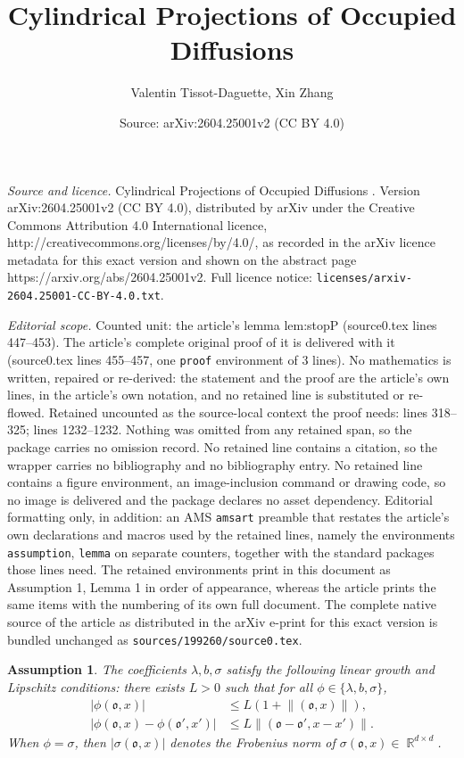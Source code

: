 \documentclass[10pt,a4paper]{amsart}
\title{\vspace{-10mm} Cylindrical Projections of Occupied Diffusions \vspace{-3mm}}
\author{Valentin Tissot-Daguette, Xin Zhang}
\date{Source: arXiv:2604.25001v2 (CC BY 4.0)}
\newtheorem{assumption}{Assumption}
\DeclareMathOperator{\R}{\mathbb{R}}
\def\mo{\mathfrak{o}}
\begin{document}
\maketitle

\noindent\emph{Source and licence.} \vspace{-10mm} Cylindrical Projections of Occupied Diffusions \vspace{-3mm}. Version arXiv:2604.25001v2 (CC BY 4.0), distributed by arXiv under the Creative Commons Attribution 4.0 International licence, http://creativecommons.org/licenses/by/4.0/, as recorded in the arXiv licence metadata for this exact version and shown on the abstract page https://arxiv.org/abs/2604.25001v2. Full licence notice: \texttt{licenses/arxiv-2604.25001-CC-BY-4.0.txt}.\par\smallskip

\noindent\textit{Editorial scope.} Counted unit: the article's lemma lem:stopP (source0.tex lines 447--453). The article's complete original proof of it is delivered with it (source0.tex lines 455--457, one \texttt{proof} environment of 3 lines). No mathematics is written, repaired or re-derived: the statement and the proof are the article's own lines, in the article's own notation, and no retained line is substituted or re-flowed.  Retained uncounted as the source-local context the proof needs: lines 318--325; lines 1232--1232.  Nothing was omitted from any retained span, so the package carries no omission record.  No retained line contains a citation, so the wrapper carries no bibliography and no bibliography entry.  No retained line contains a figure environment, an image-inclusion command or drawing code, so no image is delivered and the package declares no asset dependency.  Editorial formatting only, in addition: an AMS \texttt{amsart} preamble that restates the article's own declarations and macros used by the retained lines, namely the environments \texttt{assumption}, \texttt{lemma} on separate counters, together with the standard packages those lines need.  The retained environments print in this document as Assumption 1, Lemma 1 in order of appearance, whereas the article prints the same items with the numbering of its own full document.  The complete native source of the article as distributed in the arXiv e-print for this exact version is bundled unchanged as \texttt{sources/199260/source0.tex}.
 \begin{assumption}\label{asm:growthLip}
     The coefficients $\lambda, b, \sigma$ satisfy the following linear growth and Lipschitz conditions: there exists $L> 0$ such that for all $\phi \in \{\lambda, b, \sigma\}$,
     \begin{align*}
        | \phi(\mo,x) | &\le L(1 + \lVert (\mo,x) \rVert ), \\[0.5em]
        | \phi(\mo,x) - \phi(\mo',x') | &\le L\lVert (\mo - \mo',x - x') \rVert.
     \end{align*}
     When $\phi = \sigma$, then $|\sigma(\mo,x)|$ denotes the Frobenius norm of $\sigma(\mo,x) \in \R^{d\times d}$. 
\end{assumption}
\end{document}
